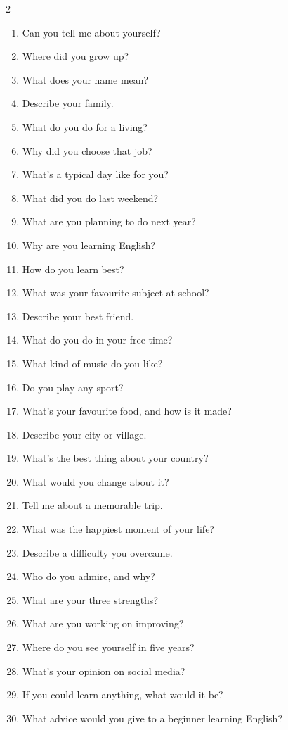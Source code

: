 \begin{tableau}
\footnotesize
\begin{multicols}{2}
\begin{anglais}
\begin{enumerate}\setlength{\itemsep}{1pt}
\item Can you tell me about yourself?
\item Where did you grow up?
\item What does your name mean?
\item Describe your family.
\item What do you do for a living?
\item Why did you choose that job?
\item What's a typical day like for you?
\item What did you do last weekend?
\item What are you planning to do next year?
\item Why are you learning English?
\item How do you learn best?
\item What was your favourite subject at school?
\item Describe your best friend.
\item What do you do in your free time?
\item What kind of music do you like?
\item Do you play any sport?
\item What's your favourite food, and how is it made?
\item Describe your city or village.
\item What's the best thing about your country?
\item What would you change about it?
\item Tell me about a memorable trip.
\item What was the happiest moment of your life?
\item Describe a difficulty you overcame.
\item Who do you admire, and why?
\item What are your three strengths?
\item What are you working on improving?
\item Where do you see yourself in five years?
\item What's your opinion on social media?
\item If you could learn anything, what would it be?
\item What advice would you give to a beginner learning English?
\end{enumerate}
\end{anglais}
\end{multicols}
\end{tableau}

